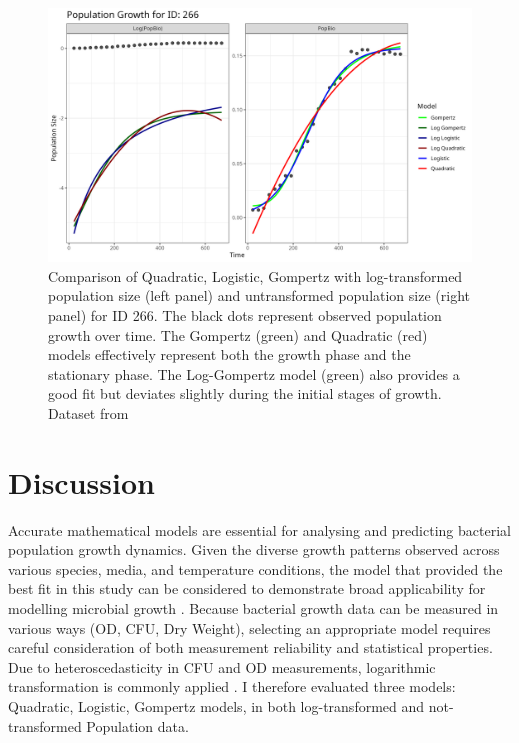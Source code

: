 \documentclass[11pt]{article}
\begin{document}
\begin{figure}[H]
        \centering
        \includegraphics[width=0.8\linewidth]{../results/modelplots/Models_Comparison_plot_ID_266.png}
        \caption{Comparison of Quadratic, Logistic, Gompertz with log-transformed population size (left panel) and untransformed population size (right panel) for ID 266. The black dots represent observed population growth over time. The Gompertz (green) and Quadratic (red) models effectively represent both the growth phase and the stationary phase. The Log-Gompertz model (green) also provides a good fit but deviates slightly during the initial stages of growth. Dataset from \parencite[]{1Bae2014}}
    \label{fig:plot}
\end{figure}


\section*{Discussion}

Accurate mathematical models are essential for analysing and predicting bacterial population growth dynamics. Given the diverse growth patterns observed across various species, media, and temperature conditions, the model that provided the best fit in this study can be considered to demonstrate broad applicability for modelling microbial growth \parencite[]{Lopez2004}. 
Because bacterial growth data can be measured in various ways (OD, CFU, Dry Weight), selecting an appropriate model requires careful consideration of both measurement reliability and statistical properties. Due to heteroscedasticity in CFU and OD measurements, logarithmic transformation is commonly applied  \parencite[]{Lopez2004, SCHAFFNER1998185}. I therefore evaluated three models: Quadratic, Logistic, Gompertz models, in both log-transformed and not-transformed Population data. 
\end{document}
